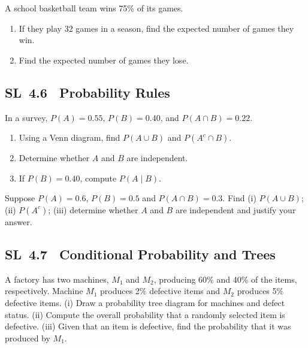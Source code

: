 \documentclass[11pt]{article}
\newcommand{\tocsubsection}[1]{\subsection{#1}}
\newcounter{question}
\begin{document}
\begin{question}
A school basketball team wins 75\% of its games.
\begin{enumerate}
    \item If they play 32 games in a season, find the expected number of games they win.
    \item Find the expected number of games they lose.
\end{enumerate}
\end{question}


\tocsubsection{SL 4.6 \; Probability Rules}

\begin{question}
In a survey, $P(A)=0.55$, $P(B)=0.40$, and $P(A\cap B)=0.22$.
\begin{enumerate}
  \item Using a Venn diagram, find $P(A\cup B)$ and $P(A^c\cap B)$.
  \item Determine whether $A$ and $B$ are independent.
  \item If $P(B)=0.40$, compute $P(A\mid B)$.
\end{enumerate}
\begin{center}
\end{center}
\end{question}


\begin{question}
Suppose $P(A)=0.6$, $P(B)=0.5$ and $P(A\cap B)=0.3$.  Find (i) $P(A\cup B)$;
(ii) $P(A^c)$; (iii) determine whether $A$ and $B$ are independent and
justify your answer.
\end{question}

\tocsubsection{SL 4.7 \; Conditional Probability and Trees}

\begin{question}
A factory has two machines, $M_1$ and $M_2$, producing 60\% and 40\% of the
items, respectively.  Machine $M_1$ produces 2\% defective items and $M_2$
produces 5\% defective items.  (i) Draw a probability tree diagram for
machines and defect status.  (ii) Compute the overall probability that a
randomly selected item is defective.  (iii) Given that an item is defective,
find the probability that it was produced by $M_1$.
\end{question}
\end{document}
